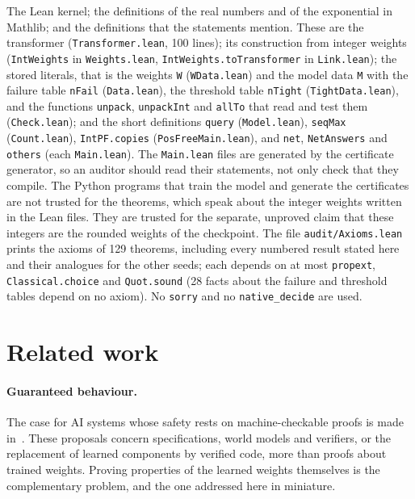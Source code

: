 \documentclass[11pt,a4paper]{article}
\newcommand{\lean}[1]{\texttt{#1}}
\begin{document}
The Lean kernel; the definitions of the real numbers and of the exponential in
Mathlib; and the definitions that the statements mention. These are the
transformer (\lean{Transformer.lean}, 100 lines); its construction from integer
weights (\lean{IntWeights} in \lean{Weights.lean},
\lean{IntWeights.toTransformer} in \lean{Link.lean}); the stored literals, that
is the weights \lean{W} (\lean{WData.lean}) and the model data \lean{M} with
the failure table \lean{nFail} (\lean{Data.lean}), the threshold table
\lean{nTight} (\lean{TightData.lean}), and the functions
\lean{unpack}, \lean{unpackInt} and \lean{allTo} that read and test them
(\lean{Check.lean}); and the short definitions \lean{query}
(\lean{Model.lean}), \lean{seqMax} (\lean{Count.lean}), \lean{IntPF.copies}
(\lean{PosFreeMain.lean}), and \lean{net}, \lean{NetAnswers} and
\lean{others} (each \lean{Main.lean}). The \lean{Main.lean} files are
generated by the certificate generator, so an auditor should read their
statements, not only check that they compile. The Python programs that train
the model and generate the certificates are not trusted for the theorems, which
speak about the integer weights written in the Lean files. They are trusted for
the separate, unproved claim that these integers are the rounded weights of the
checkpoint. The file \lean{audit/Axioms.lean} prints the axioms of 129
theorems, including every numbered result stated here and their analogues for the other
seeds; each depends on at most \lean{propext}, \lean{Classical.choice} and
\lean{Quot.sound} (28 facts about the failure and threshold tables depend on no axiom). No \lean{sorry} and no \lean{native\_decide} are used.

\section{Related work}\label{sec:related}

\paragraph{Guaranteed behaviour.}
The case for AI systems whose safety rests on machine-checkable proofs is made
in~\cite{tegmark2023provably,dalrymple2024gsai}. These proposals concern
specifications, world models and verifiers, or the replacement of learned
components by verified code, more than proofs about trained weights. Proving
properties of the learned weights themselves is the complementary problem, and
the one addressed here in miniature.
\end{document}
